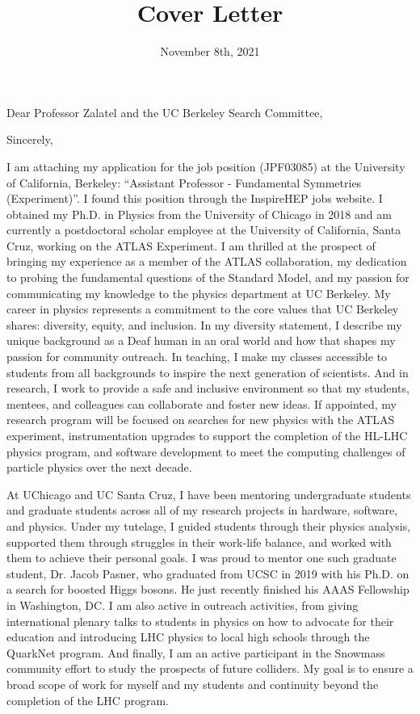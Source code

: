 \documentclass[10pt,letterpaper,sans]{moderncv} %
\title{Cover Letter}
\begin{document}
\date{November 8th, 2021}
\opening{Dear Professor Zalatel and the UC Berkeley Search Committee,}
\closing{Sincerely,}

\makelettertitle
\vspace*{-1em}

I am attaching my application for the job position (JPF03085) at the University of California, Berkeley: ``Assistant Professor - Fundamental Symmetries (Experiment)''. I found this position through the InspireHEP jobs website. I obtained my Ph.D. in Physics from the University of Chicago in 2018 and am currently a postdoctoral scholar employee at the University of California, Santa Cruz, working on the ATLAS Experiment. I am thrilled at the prospect of bringing my experience as a member of the ATLAS collaboration, my dedication to probing the fundamental questions of the Standard Model, and my passion for communicating my knowledge to the physics department at UC Berkeley. My career in physics represents a commitment to the core values that UC Berkeley shares: diversity, equity, and inclusion. In my diversity statement, I describe my unique background as a Deaf human in an oral world and how that shapes my passion for community outreach. In teaching, I make my classes accessible to students from all backgrounds to inspire the next generation of scientists. And in research, I work to provide a safe and inclusive environment so that my students, mentees, and colleagues can collaborate and foster new ideas. If appointed, my research program will be focused on searches for new physics with the ATLAS experiment, instrumentation upgrades to support the completion of the HL-LHC physics program, and software development to meet the computing challenges of particle physics over the next decade.

At UChicago and UC Santa Cruz, I have been mentoring undergraduate students and graduate students across all of my research projects in hardware, software, and physics. Under my tutelage, I guided students through their physics analysis, supported them through struggles in their work-life balance, and worked with them to achieve their personal goals. I was proud to mentor one such graduate student, Dr. Jacob Pasner, who graduated from UCSC in 2019 with his Ph.D. on a search for boosted Higgs bosons. He just recently finished his AAAS Fellowship in Washington, DC. I am also active in outreach activities, from giving international plenary talks to students in physics on how to advocate for their education and introducing LHC physics to local high schools through the QuarkNet program. And finally, I am an active participant in the Snowmass community effort to study the prospects of future colliders. My goal is to ensure a broad scope of work for myself and my students and continuity beyond the completion of the LHC program.
\end{document}
